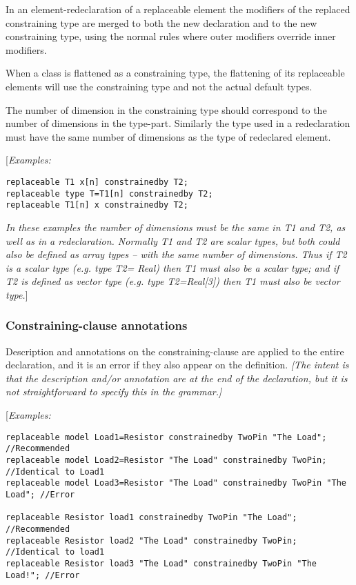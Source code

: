In an element-redeclaration of a replaceable element the modifiers of
the replaced constraining type are merged to both the new declaration
and to the new constraining type, using the normal rules where outer
modifiers override inner modifiers.

When a class is flattened as a constraining type, the flattening of its
replaceable elements will use the constraining type and not the actual
default types.

The number of dimension in the constraining type should correspond to
the number of dimensions in the type-part. Similarly the type used in a
redeclaration must have the same number of dimensions as the type of
redeclared element.

{[}\emph{Examples:}
\begin{lstlisting}[language=modelica]
replaceable T1 x[n] constrainedby T2;
replaceable type T=T1[n] constrainedby T2;
replaceable T1[n] x constrainedby T2;
\end{lstlisting}

\emph{In these examples the number of dimensions must be the same in T1
and T2, as well as in a redeclaration. Normally T1 and T2 are scalar
types, but both could also be defined as array types -- with the same
number of dimensions. Thus if T2 is a scalar type (e.g. type T2= Real)
then T1 must also be a scalar type; and if T2 is defined as vector type
  (e.g. type T2=Real[3]) then T1 must also be vector type.}]
\subsubsection{Constraining-clause annotations}

Description and annotations on the constraining-clause are applied to
the entire declaration, and it is an error if they also appear on the
definition. \emph{{[}The intent is that the description and/or
annotation are at the end of the declaration, but it is not
straightforward to specify this in the grammar.{]}}

{[}\emph{Examples:}
\begin{lstlisting}[language=modelica]
replaceable model Load1=Resistor constrainedby TwoPin "The Load"; //Recommended
replaceable model Load2=Resistor "The Load" constrainedby TwoPin; //Identical to Load1
replaceable model Load3=Resistor "The Load" constrainedby TwoPin "The Load"; //Error

replaceable Resistor load1 constrainedby TwoPin "The Load"; //Recommended
replaceable Resistor load2 "The Load" constrainedby TwoPin; //Identical to load1
replaceable Resistor load3 "The Load" constrainedby TwoPin "The Load!"; //Error
\end{lstlisting}

